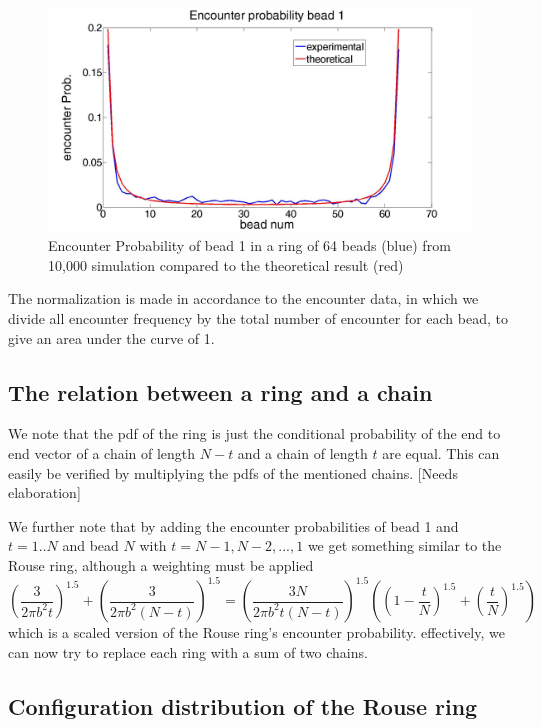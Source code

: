 \documentclass{report}
\begin{document}
\begin{figure}[h!]
\includegraphics[scale=0.2]{encounterProbBead1InLoopOf64BeadsSimpleRouse}\caption{Encounter Probability of bead 1 in a ring of 64 beads (blue) from 10,000 simulation compared to the theoretical result (red)}\label{figure_rouseRingEncounterProbabilityComparisionToTheory}
\end{figure}
The normalization is made in accordance to the encounter data, in which we divide all encounter frequency by the total number of encounter for each bead, to give an area under the curve of 1. 

\subsection{The relation between a ring and a chain}\label{subsction_theRelationBetweenARingAndAChain}
We note that the pdf of the ring is just the conditional probability of the end to end vector of a chain of length $N-t$ and a chain of length $t$ are equal. This can easily be verified by multiplying the pdfs of the mentioned chains. [Needs elaboration]

We further note that by adding the encounter probabilities of bead 1 and $t=1..N$ and bead $N$ with $t=N-1,N-2,...,1$ we get something similar to the Rouse ring, although a weighting must be applied 
\begin{equation*}
\left(\frac{3}{2\pi b^2 t}\right)^{1.5}+\left(\frac{3}{2\pi b^2(N-t)}\right)^{1.5}=\left(\frac{3N}{2\pi b^2 t(N-t)}\right)^{1.5}\left((1-\frac{t}{N})^{1.5}+\left(\frac{t}{N} \right)^{1.5}\right)
\end{equation*}
which is a scaled version of the Rouse ring's encounter probability. 
effectively, we can now try to replace each ring with a sum of two chains. 
\subsection{Configuration distribution of the Rouse ring}\label{subsection_configurationDistributionRouseRing}
\end{document}
